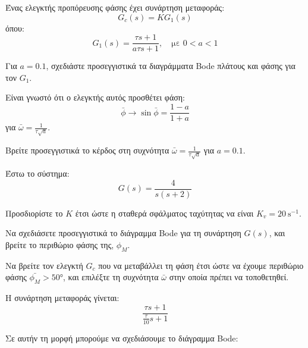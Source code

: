 \documentclass[11pt,a4paper,notitlepage,fleqn,final]{article}
\begin{document}
\begin{exercise}
Ένας ελεγκτής προπόρευσης φάσης έχει συνάρτηση μεταφοράς:
\[
G_c(s) = KG_1(s)
\]
όπου:
\[
G_1(s) = \frac{τs+1}{aτs+1},\quad \text{με } 0<a<1
\]

\begin{enumgreekparen}
	\item Για \( a = 0.1 \), σχεδιάστε προσεγγιστικά τα διαγράμματα Bode πλάτους και φάσης
	για τον \( G_1 \).
	\item Είναι γνωστό ότι ο ελεγκτής αυτός προσθέτει φάση:
	\[
	\bar\phi \rightarrow \sin\bar\phi = \frac{1-a}{1+a}
	\]
	για \( \bar\omega = \frac{1}{τ\sqrt{a}} \).
	
	Βρείτε προσεγγιστικά το κέρδος στη συχνότητα \( \bar\omega = \frac{1}{τ\sqrt{a}} \) για
	\( a=0.1 \).
	\item Έστω το σύστημα:
	\[
	G(s) = \frac{4}{s(s+2)}
	\]
	
	
	Προσδιορίστε το \( K \) έτσι ώστε η σταθερά σφάλματος ταχύτητας να είναι
	\( K_v = \SI{20}{\second^{-1}} \).
	\item Να σχεδιάσετε προσεγγιστικά το διάγραμμα Bode για τη συνάρτηση
	\( \displaystyle G(s) \), και βρείτε το περιθώριο φάσης της, \( \phi_M \).
	\item Να βρείτε τον ελεγκτή \( G_c \) που να μεταβάλλει τη φάση έτσι ώστε να έχουμε περιθώριο φάσης \( \bar{\phi_M} > \ang{50} \), και επιλέξτε τη συχνότητα
	\( \bar\omega  \) στην οποία πρέπει να τοποθετηθεί.
\end{enumgreekparen}

\tcblower
\begin{enumgreekparen}
	\item Η συνάρτηση μεταφοράς γίνεται:
	\[
	\frac{τs+1}{\frac{τ}{10}s+1}
	\]
	
	Σε αυτήν τη μορφή μπορούμε να σχεδιάσουμε το διάγραμμα Bode:
	

\end{enumgreekparen}
\end{exercise}
\end{document}

